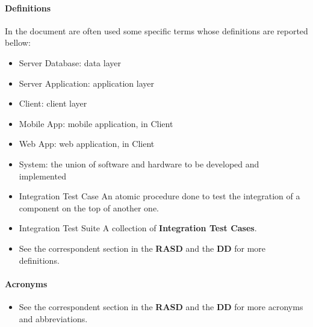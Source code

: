 \paragraph{Definitions}
In the document are often used some specific terms whose definitions are reported bellow:
\begin{itemize}
	\item Server Database: data layer
	\item Server Application: application layer
	\item Client: client layer
	\item Mobile App: \PowerEnJoy{} mobile application, in Client
	\item Web App: \PowerEnJoy{} web application, in Client
	\item System: the union of software and hardware to be developed and implemented
	\item{Integration Test Case} An atomic procedure done to test the integration of a component on the top of another one.
	\item{Integration Test Suite} A collection of \textbf{Integration Test Cases}.
	\item See the correspondent section in the \textbf{RASD} and the \textbf{DD} for more definitions.
\end{itemize}
\paragraph{Acronyms}
\begin{itemize}
	 Requirements Analysis and Specification Document
	 Design Document
	 Application Programming Interface
	 DataBase Management System
	 Integration Test Plan Document.
	 Integration Test Suite number n.
	 Integration Test Case number m of the Integration Test Suite number n.
	 JavaScript.
	 User Interface.
	\item See the correspondent section in the \textbf{RASD} and the \textbf{DD} for more acronyms and abbreviations.
\end{itemize}
